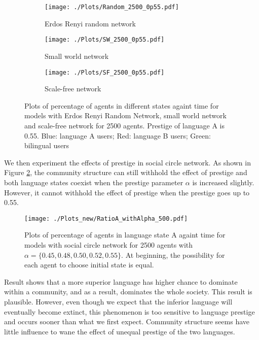 \documentclass[a4paper, 11pt]{article}
\begin{document}
\begin{figure}
  \begin{subfigure}[b]{0.32\textwidth}
    \texttt{[image: ./Plots/Random\_2500\_0p55.pdf]}
    \caption{Erdos Renyi random network}
  \end{subfigure}
  \begin{subfigure}[b]{0.32\textwidth}
    \texttt{[image: ./Plots/SW\_2500\_0p55.pdf]}
    \caption{Small world network}
  \end{subfigure}
  \begin{subfigure}[b]{0.32\textwidth}
    \texttt{[image: ./Plots/SF\_2500\_0p55.pdf]}
    \caption{Scale-free network}
  \end{subfigure}
\caption{Plots of percentage of agents in different states againt time for models with Erdos Renyi Random Network, small world network and scale-free network for 2500 agents. Prestige of language A is 0.55. Blue: language A users; Red: language B users; Green: bilingual users}
\label{ohne_comm_up}
\end{figure}

We then experiment the effects of prestige in social circle network. As shown in Figure \ref{social_circle_up}, the community structure can still withhold the effect of prestige and both language states coexist when the prestige parameter $\alpha$ is increased slightly. However, it cannot withhold the effect of prestige when the prestige goes up to 0.55. 

\begin{figure}[!tbp] 
  \centering
  \texttt{[image: ./Plots\_new/RatioA\_withAlpha\_500.pdf]}
\caption{Plots of percentage of agents in language state A againt time for models with social circle network for 2500 agents with $\alpha = \{0.45, 0.48, 0.50, 0.52, 0.55\}$. At beginning, the possibility for each agent to choose initial state is equal.}
\label{social_circle_up}
\end{figure}

Result shows that a more superior language has higher chance to dominate within a community, and as a result, dominates the whole society. This result is plausible. However, even though we expect that the inferior language will eventually become extinct, this phenomenon is too sensitive to language prestige and occurs sooner than what we first expect. Community structure seems have little influence to wane the effect of unequal prestige of the two languages. 
\end{document}
